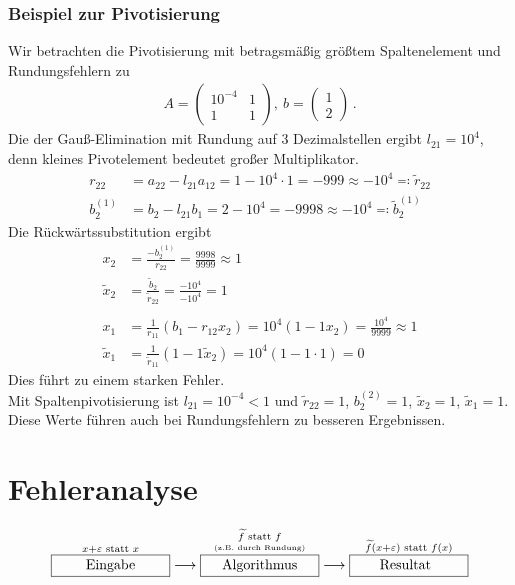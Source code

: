 \documentclass[ngerman,fontsize=11pt, paper=a4, parskip=half, titlepage=true, toc=bib]{scrbook}
\begin{document}
\subsection{Beispiel zur Pivotisierung}
Wir betrachten die Pivotisierung mit betragsmäßig größtem Spaltenelement
und Rundungsfehlern zu
\begin{gather*}
  A=\begin{pmatrix}
    10^{-4} & 1 \\ 1 & 1
  \end{pmatrix}, ~
  b= \begin{pmatrix*}
    1 \\ 2
  \end{pmatrix*}\, .
\end{gather*}
Die der Gauß-Elimination mit Rundung auf 3 Dezimalstellen ergibt
$l_{21}=10^4$, denn kleines Pivotelement bedeutet großer Multiplikator. \\
\begin{align*}
  r_{22}&=a_{22}-l_{21}a_{12} = 1-10^4\cdot 1 = -999 \approx -10^4 \eqqcolon \widetilde{r}_{22}\\
  b_2^{(1)} & = b_2-l_{21}b_1 = 2-10^4 = -9998 \approx -10^4 \eqqcolon \widetilde{b}_2^{(1)} 
\end{align*}
Die Rückwärtssubstitution ergibt
\begin{align*}
  x_2 &= \frac{-b_2^{(1)}}{r_{22}} = \frac{9998}{9999} \approx 1\\
  \widetilde{x}_	2 &= \frac{\widetilde{b}_2}{\widetilde{r}_{22}} = \frac{-10^4}{-10^4} = 1 \\\\
  x_1 &= \frac{1}{r_{11}}(b_1-r_{12}x_2)= 10^4 (1-1x_2) = \frac{10^4}{9999}\approx 1\\
  \widetilde{	x}_1 &= \frac{1}{\widetilde{r}_{11}}(1-1\widetilde{x}_2)= 10^4 (1-1\cdot 1) = 0 
\end{align*}
Dies führt zu einem starken Fehler.\\

Mit Spaltenpivotisierung ist $l_{21}=10^{-4}<1$ und 
$\widetilde{r}_{22}=1$, $b_2^{(2)} = 1$, $\widetilde{x}_2=1$, $\widetilde{x}_1=1$.\\
Diese Werte führen auch bei Rundungsfehlern zu besseren Ergebnissen.


\chapter{Fehleranalyse} \label{3}
% 
\begin{align*}
  \overset{x+\varepsilon \text{ statt } x}{\framebox[3cm]{Eingabe}} \longrightarrow 
  \overset{\underset{\text{\tiny (z.B. durch Rundung)}}{\widetilde{f} \text{ statt } f}}{\framebox[3cm]{Algorithmus}} \longrightarrow
  \overset{\widetilde{f}(x+\varepsilon) \text{ statt } f(x)}{\framebox[3cm]{Resultat\phantom{g}}}
\end{align*}\\
\end{document}
